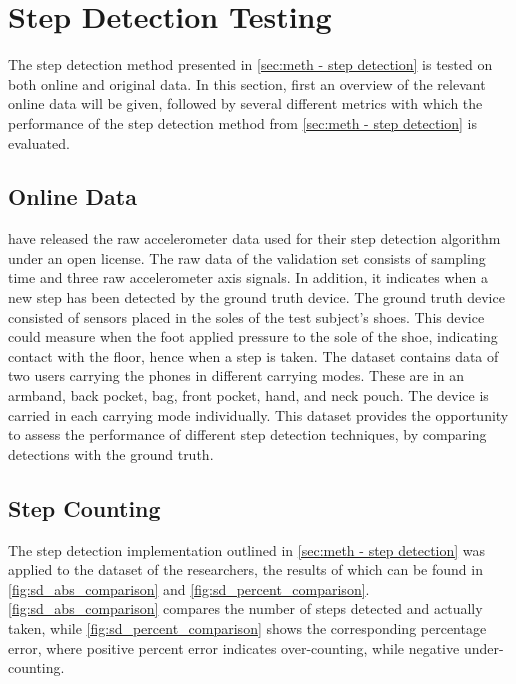 \section{Step Detection Testing}
\label{sec:results-step_detection}
The step detection method presented in \cref{sec:meth - step detection} is tested on both online and original data. In this section, first an overview of the relevant online data will be given, followed by several different metrics with which the performance of the step detection method from \cref{sec:meth - step detection} is evaluated. 


\subsection{Online Data}
\citet{Salvi2018} have released the raw accelerometer data used for their step detection algorithm under an open license. The raw data of the validation set consists of sampling time and three raw accelerometer axis signals. In addition, it indicates when a new step has been detected by the ground truth device. The ground truth device consisted of sensors placed in the soles of the test subject's shoes. This device could measure when the foot applied pressure to the sole of the shoe, indicating contact with the floor, hence when a step is taken. The dataset contains data of two users carrying the phones in different carrying modes. These are in an armband, back pocket, bag, front pocket, hand, and neck pouch. The device is carried in each carrying mode individually.  This dataset provides the opportunity to assess the performance of different step detection techniques, by comparing detections with the ground truth.\par

\subsection{Step Counting}

The step detection implementation outlined in \cref{sec:meth - step detection} was applied to the dataset of the researchers, the results of which can be found in  \cref{fig:sd_abs_comparison} and \cref{fig:sd_percent_comparison}. \cref{fig:sd_abs_comparison} compares the number of steps detected and actually taken, while \cref{fig:sd_percent_comparison}  shows the corresponding percentage error, where positive percent error indicates over-counting, while negative under-counting. \par 

